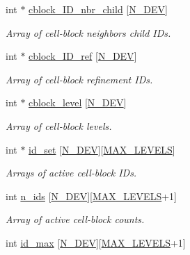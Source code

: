 \begin{DoxyCompactItemize}
int $\ast$ \hyperlink{classMesh_abb8b2b9b54bc8d342bd5db602063f133}{cblock\+\_\+\+I\+D\+\_\+nbr\+\_\+child} \mbox{[}\hyperlink{cppspec_8h_a2b674dab7a14f1bf32b48b7fda5022dc}{N\+\_\+\+D\+EV}\mbox{]}
\begin{DoxyCompactList}\small\item\em Array of cell-\/block neighbor\textquotesingle{}s child I\+Ds. \end{DoxyCompactList}\item 
int $\ast$ \hyperlink{classMesh_a4bc1d7b73f4d7fdae4f547eef4684b7b}{cblock\+\_\+\+I\+D\+\_\+ref} \mbox{[}\hyperlink{cppspec_8h_a2b674dab7a14f1bf32b48b7fda5022dc}{N\+\_\+\+D\+EV}\mbox{]}
\begin{DoxyCompactList}\small\item\em Array of cell-\/block refinement I\+Ds. \end{DoxyCompactList}\item 
int $\ast$ \hyperlink{classMesh_ab5fd345e916788a1add5c7da96526b16}{cblock\+\_\+level} \mbox{[}\hyperlink{cppspec_8h_a2b674dab7a14f1bf32b48b7fda5022dc}{N\+\_\+\+D\+EV}\mbox{]}
\begin{DoxyCompactList}\small\item\em Array of cell-\/block levels. \end{DoxyCompactList}\item 
int $\ast$ \hyperlink{classMesh_a56b8d1c6a79e59537d3ca70fb176fe30}{id\+\_\+set} \mbox{[}\hyperlink{cppspec_8h_a2b674dab7a14f1bf32b48b7fda5022dc}{N\+\_\+\+D\+EV}\mbox{]}\mbox{[}\hyperlink{cppspec_8h_add784659439a8dd6b1423406171414d3}{M\+A\+X\+\_\+\+L\+E\+V\+E\+LS}\mbox{]}
\begin{DoxyCompactList}\small\item\em Arrays of active cell-\/block I\+Ds. \end{DoxyCompactList}\item 
int \hyperlink{classMesh_adfba87c2fca6988d3e41e40c0597bd38}{n\+\_\+ids} \mbox{[}\hyperlink{cppspec_8h_a2b674dab7a14f1bf32b48b7fda5022dc}{N\+\_\+\+D\+EV}\mbox{]}\mbox{[}\hyperlink{cppspec_8h_add784659439a8dd6b1423406171414d3}{M\+A\+X\+\_\+\+L\+E\+V\+E\+LS}+1\mbox{]}
\begin{DoxyCompactList}\small\item\em Array of active cell-\/block counts. \end{DoxyCompactList}\item 
int \hyperlink{classMesh_a6be89a1cad38e58c6904e8125ce26a82}{id\+\_\+max} \mbox{[}\hyperlink{cppspec_8h_a2b674dab7a14f1bf32b48b7fda5022dc}{N\+\_\+\+D\+EV}\mbox{]}\mbox{[}\hyperlink{cppspec_8h_add784659439a8dd6b1423406171414d3}{M\+A\+X\+\_\+\+L\+E\+V\+E\+LS}+1\mbox{]}

\end{DoxyCompactItemize}
